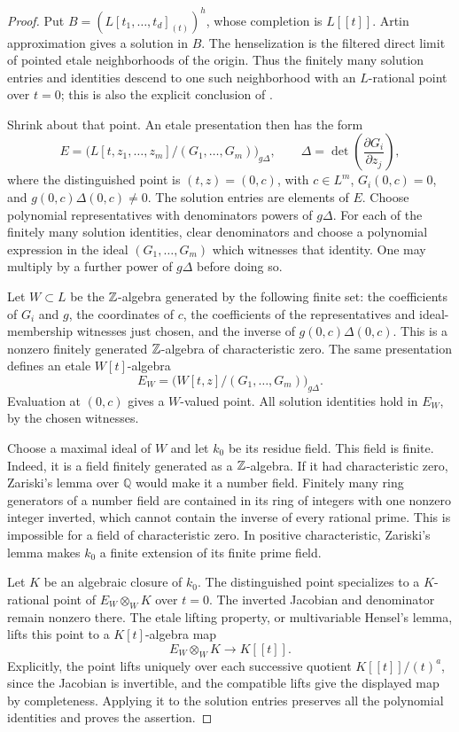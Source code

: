 \begin{proof}
Put $B=(L[t_1,\ldots,t_d]_{(t)})^h$, whose completion is $L[[t]]$.
Artin approximation \cite[Theorem~1.10]{Artin} gives a solution in
$B$.  The henselization is the filtered direct limit of pointed
etale neighborhoods of the origin.  Thus the finitely many solution
entries and identities descend to one such neighborhood with an
$L$-rational point over $t=0$; this is also the explicit conclusion
of \cite[Corollary~2.1]{Artin}.

Shrink about that point.  An etale presentation then has the form
\[
 E=\bigl(L[t,z_1,\ldots,z_m]/(G_1,\ldots,G_m)\bigr)_{g\Delta},
 \qquad
 \Delta=\det\left(\frac{\partial G_i}{\partial z_j}\right),
\]
where the distinguished point is $(t,z)=(0,c)$, with
$c\in L^m$, $G_i(0,c)=0$, and $g(0,c)\Delta(0,c)\ne0$.
The solution entries are elements of $E$.  Choose polynomial
representatives with denominators powers of $g\Delta$.  For each
of the finitely many solution identities, clear denominators and
choose a polynomial expression in the ideal $(G_1,\ldots,G_m)$
which witnesses that identity.  One may multiply by a further power
of $g\Delta$ before doing so.

Let $W\subset L$ be the $\mathbb Z$-algebra generated by the following
finite set: the coefficients of $G_i$ and $g$, the coordinates of
$c$, the coefficients of the representatives and ideal-membership
witnesses just chosen, and the inverse of $g(0,c)\Delta(0,c)$.
This is a nonzero finitely generated $\mathbb Z$-algebra of characteristic
zero.  The same presentation defines an etale $W[t]$-algebra
\[
 E_W=\bigl(W[t,z]/(G_1,\ldots,G_m)\bigr)_{g\Delta}.
\]
Evaluation at $(0,c)$ gives a $W$-valued point.  All solution
identities hold in $E_W$, by the chosen witnesses.

Choose a maximal ideal of $W$ and let $k_0$ be its residue field.
This field is finite.  Indeed, it is a field finitely generated as a
$\mathbb Z$-algebra.  If it had characteristic zero, Zariski's lemma over
$\mathbb Q$ would make it a number field.  Finitely many ring
generators of a number field are contained in its ring of integers
with one nonzero integer inverted, which cannot contain the inverse
of every rational prime.  This is impossible for a field of
characteristic zero.  In positive characteristic, Zariski's lemma
makes $k_0$ a finite extension of its finite prime field.

Let $K$ be an algebraic closure of $k_0$.  The distinguished point
specializes to a $K$-rational point of $E_W\otimes_W K$ over $t=0$.
The inverted Jacobian and denominator remain nonzero there.
The etale lifting property, or multivariable Hensel's lemma, lifts
this point to a $K[t]$-algebra map
\[
 E_W\otimes_W K\longrightarrow K[[t]].
\]
Explicitly, the point lifts uniquely over each successive quotient
$K[[t]]/(t)^a$, since the Jacobian is invertible, and the compatible
lifts give the displayed map by completeness.  Applying it to the
solution entries preserves all the polynomial identities and proves
the assertion.
\end{proof}

